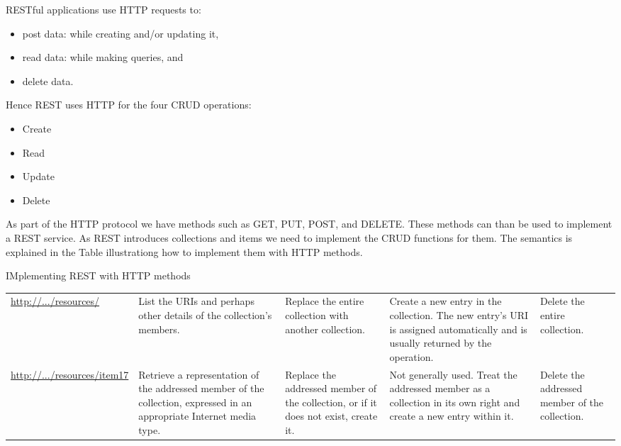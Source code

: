 RESTful applications use HTTP requests to:
\begin{itemize}
\item {} 
post data: while creating and/or updating it,

\item {} 
read data: while making queries, and

\item {} 
delete data.

\end{itemize}

Hence REST uses HTTP for the four CRUD operations:
\begin{itemize}
\item {} 
Create

\item {} 
Read

\item {} 
Update

\item {} 
Delete

\end{itemize}

As part of the HTTP protocol we have methods such as GET, PUT, POST,
and DELETE. These methods can than be used to implement a REST
service. As REST introduces collections and items we need to implement
the CRUD functions for them. The semantics is explained in the Table
illustrationg how to implement them with HTTP methods.


\begin{threeparttable}
\capstart\caption{IMplementing REST with HTTP methods}\label{\detokenize{lesson/prg/rest:id1}}
\noindent\begin{tabulary}{\linewidth}{|L|L|L|L|L|}
\hline
{}\relax &\relax &\relax &\relax &\relax \\
\hline
\url{http://.../resources/}
&
List the URIs and perhaps other details of the collection's
members.
&
Replace the entire collection with another collection.
&
Create a new entry in the collection. The new entry's URI is
assigned automatically and is usually returned by the
operation.
&
Delete the entire collection.
\\
\hline
\url{http://.../resources/item17}
&
Retrieve a representation of the addressed member of the
collection, expressed in an appropriate Internet media type.
&
Replace the addressed member of the collection, or if it does
not exist, create it.
&
Not generally used. Treat the addressed member as a collection
in its own right and create a new entry within it.
&
Delete the addressed member of the collection.
\\
\hline\end{tabulary}

\end{threeparttable}


